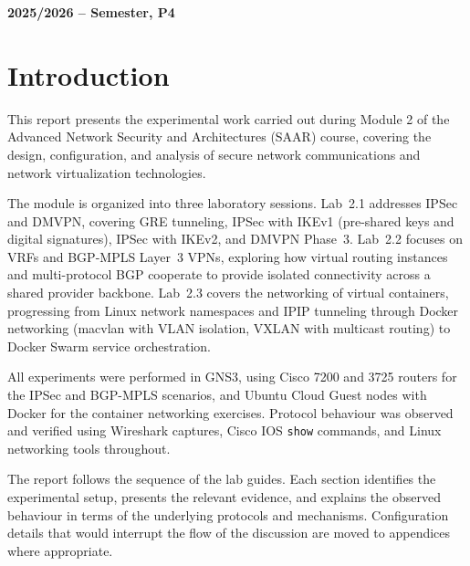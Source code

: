 \documentclass[12pt]{article}
\begin{document}
\begin{center}
    \large \bf 2025/2026 --  Semester, P4
\end{center}

\thispagestyle{empty}

\setcounter{page}{0}

\newpage

\tableofcontents 

\newpage


\section{Introduction}

This report presents the experimental work carried out during Module 2 of the 
Advanced Network Security and Architectures (SAAR) course, covering the design, 
configuration, and analysis of secure network communications and network 
virtualization technologies.

The module is organized into three laboratory sessions. Lab~2.1 addresses IPSec 
and DMVPN, covering GRE tunneling, IPSec with IKEv1 (pre-shared keys and digital 
signatures), IPSec with IKEv2, and DMVPN Phase~3. Lab~2.2 focuses on VRFs and 
BGP-MPLS Layer~3 VPNs, exploring how virtual routing instances and multi-protocol 
BGP cooperate to provide isolated connectivity across a shared provider backbone. 
Lab~2.3 covers the networking of virtual containers, progressing from Linux network 
namespaces and IPIP tunneling through Docker networking (macvlan with VLAN 
isolation, VXLAN with multicast routing) to Docker Swarm service orchestration.

All experiments were performed in GNS3, using Cisco 7200 and 3725 routers for the 
IPSec and BGP-MPLS scenarios, and Ubuntu Cloud Guest nodes with Docker for the 
container networking exercises. Protocol behaviour was observed and verified using 
Wireshark captures, Cisco IOS \texttt{show} commands, and Linux networking tools 
throughout.

The report follows the sequence of the lab guides. Each section identifies the 
experimental setup, presents the relevant evidence, and explains the observed 
behaviour in terms of the underlying protocols and mechanisms. Configuration 
details that would interrupt the flow of the discussion are moved to appendices 
where appropriate.
\end{document}
